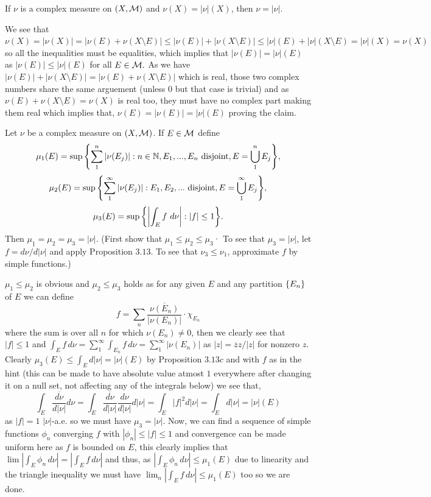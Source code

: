 \documentclass[12pt,a4paper]{article}
\begin{document}
\begin{problem}\label{prob:3-20}
If $\nu$ is a complex measure on $(X,\mathcal{M})$ and $\nu(X)=|\nu|(X)$, then $\nu=|\nu|$.
\end{problem}
\begin{solution}
We see that $\nu(X)=|\nu(X)|=|\nu(E)+\nu(X\setminus E)|\leq|\nu(E)|+|\nu(X\setminus E)|\leq|\nu|(E)+|\nu|(X\setminus E)=|\nu|(X)=\nu(X)$ so all the inequalities must be equalities, which implies that $|\nu(E)|=|\nu|(E)$ as $|\nu(E)|\leq|\nu|(E)$ for all $E\in\mathcal{M}.$ 
As we have $|\nu(E)|+|\nu(X\setminus E)|=|\nu(E)+\nu(X\setminus E)|$ which is real, those two complex numbers share the same arguement (unless $0$ but that case is trivial) and as $\nu(E)+\nu(X\setminus E)=\nu(X)$ is real too, they must have no complex part making them real which implies that, $\nu(E)=|\nu(E)|=|\nu|(E)$ proving the claim.
\end{solution}
\begin{problem}\label{prob:3-21}
Let $\nu$ be a complex measure on $(X, \mathcal{M})$. If $E\in\mathcal{M}$ define
\[\mu_{1}(E)=\sup\qty{\sum_{1}^{n}|\nu(E_{j})|:n\in\mathbb{N},E_{1},...,E_{n} \text{ disjoint}, E=\bigcup_{1}^{n}E_{j}},\]
\[\mu_{2}(E)=\sup\qty{\sum_{1}^{\infty}|\nu(E_{j})|:E_{1},E_{2},... \text{ disjoint}, E=\bigcup_{1}^{\infty}E_{j}},\]
\[\mu_{3}(E)=\sup\qty{\qty|\int_{E}f~d\nu|:|f|\leq 1}.\]
Then $\mu_{1}=\mu_{2}=\mu_{3}=|\nu|$. (First show that $\mu_1\leq\mu_2\leq\mu_3$· To see that $\mu_3 = |\nu|$, let $f=\overline{d\nu/d|\nu|}$ and apply Proposition $3.13.$ To see that $\nu_3\leq\nu_1$, approximate $f$ by simple functions.)
\end{problem}
\begin{solution}
$\mu_1\leq\mu_2$ is obvious and $\mu_2\leq\mu_3$ holds as for any given $E$ and any partition $\qty{E_n}$ of $E$ we can define
\[
	f=\sum_n \frac{\overline{\nu(E_n)}}{|\nu(E_n)|}\cdot\chi_{E_n}
\]
where the sum is over all $n$ for which $\nu(E_n)\neq 0$, then we clearly see that $|f|\leq 1$ and $\int_Ef\,d\nu=\sum_1^\infty\int_{E_n}f\,d\nu=\sum_1^\infty|\nu(E_n)|$ as $|z|=\overline{z}z/|z|$ for nonzero $z.$ 
Clearly $\mu_3(E)\leq\int_E d|\nu|=|\nu|(E)$ by Proposition $3.13c$ and with $f$ as in the hint (this can be made to have absolute value atmost $1$ everywhere after changing it on a null set, not affecting any of the integrals below) we see that, 
\[
	\int_E\overline{ \frac{d\nu}{d|\nu|}}d\nu=\int_E\overline{ \frac{d\nu}{d|\nu|}} \frac{d\nu}{d|\nu|}d|\nu|=\int_E|f|^2d|\nu|=\int_Ed|\nu|=|\nu|(E)
\]
as $|f|=1$ $|\nu|$-a.e. so we must have $\mu_3=|\nu|$. 
Now, we can  find a sequence of simple functions $\phi_n$ converging $f$ with $|\phi_n|\leq |f|\leq 1$ and convergence can be made uniform here as $f$ is bounded on $E$, this clearly implies that $\lim|\int_E\phi_n\,d\nu|=|\int_E f\,d\nu|$ and thus, as $|\int_E\phi_n\,d\nu|\leq\mu_1(E)$ due to linearity and the triangle inequality we must have $\lim_n|\int_E f\,d\nu|\leq\mu_1(E)$ too so we are done.
\end{solution}
\end{document}
